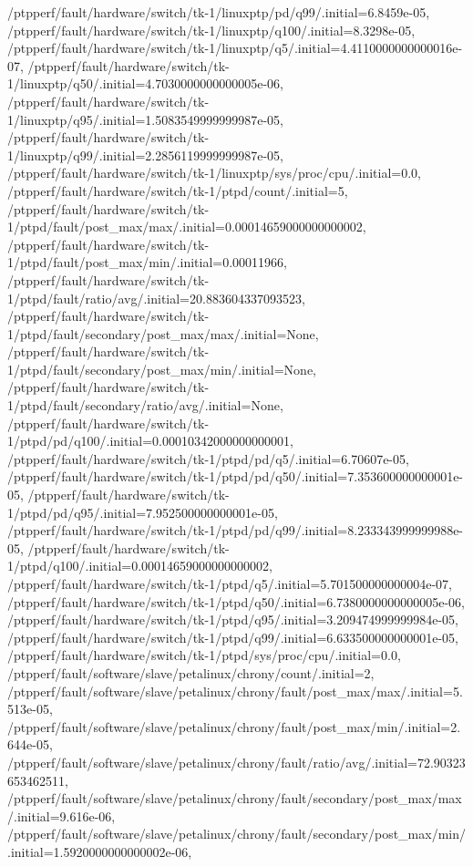 {    /ptpperf/fault/hardware/switch/tk-1/linuxptp/pd/q99/.initial=6.8459e-05,
    /ptpperf/fault/hardware/switch/tk-1/linuxptp/q100/.initial=8.3298e-05,
    /ptpperf/fault/hardware/switch/tk-1/linuxptp/q5/.initial=4.4110000000000016e-07,
    /ptpperf/fault/hardware/switch/tk-1/linuxptp/q50/.initial=4.7030000000000005e-06,
    /ptpperf/fault/hardware/switch/tk-1/linuxptp/q95/.initial=1.5083549999999987e-05,
    /ptpperf/fault/hardware/switch/tk-1/linuxptp/q99/.initial=2.2856119999999987e-05,
    /ptpperf/fault/hardware/switch/tk-1/linuxptp/sys/proc/cpu/.initial=0.0,
    /ptpperf/fault/hardware/switch/tk-1/ptpd/count/.initial=5,
    /ptpperf/fault/hardware/switch/tk-1/ptpd/fault/post_max/max/.initial=0.00014659000000000002,
    /ptpperf/fault/hardware/switch/tk-1/ptpd/fault/post_max/min/.initial=0.00011966,
    /ptpperf/fault/hardware/switch/tk-1/ptpd/fault/ratio/avg/.initial=20.883604337093523,
    /ptpperf/fault/hardware/switch/tk-1/ptpd/fault/secondary/post_max/max/.initial=None,
    /ptpperf/fault/hardware/switch/tk-1/ptpd/fault/secondary/post_max/min/.initial=None,
    /ptpperf/fault/hardware/switch/tk-1/ptpd/fault/secondary/ratio/avg/.initial=None,
    /ptpperf/fault/hardware/switch/tk-1/ptpd/pd/q100/.initial=0.00010342000000000001,
    /ptpperf/fault/hardware/switch/tk-1/ptpd/pd/q5/.initial=6.70607e-05,
    /ptpperf/fault/hardware/switch/tk-1/ptpd/pd/q50/.initial=7.353600000000001e-05,
    /ptpperf/fault/hardware/switch/tk-1/ptpd/pd/q95/.initial=7.952500000000001e-05,
    /ptpperf/fault/hardware/switch/tk-1/ptpd/pd/q99/.initial=8.233343999999988e-05,
    /ptpperf/fault/hardware/switch/tk-1/ptpd/q100/.initial=0.00014659000000000002,
    /ptpperf/fault/hardware/switch/tk-1/ptpd/q5/.initial=5.701500000000004e-07,
    /ptpperf/fault/hardware/switch/tk-1/ptpd/q50/.initial=6.7380000000000005e-06,
    /ptpperf/fault/hardware/switch/tk-1/ptpd/q95/.initial=3.209474999999984e-05,
    /ptpperf/fault/hardware/switch/tk-1/ptpd/q99/.initial=6.633500000000001e-05,
    /ptpperf/fault/hardware/switch/tk-1/ptpd/sys/proc/cpu/.initial=0.0,
    /ptpperf/fault/software/slave/petalinux/chrony/count/.initial=2,
    /ptpperf/fault/software/slave/petalinux/chrony/fault/post_max/max/.initial=5.513e-05,
    /ptpperf/fault/software/slave/petalinux/chrony/fault/post_max/min/.initial=2.644e-05,
    /ptpperf/fault/software/slave/petalinux/chrony/fault/ratio/avg/.initial=72.90323653462511,
    /ptpperf/fault/software/slave/petalinux/chrony/fault/secondary/post_max/max/.initial=9.616e-06,
    /ptpperf/fault/software/slave/petalinux/chrony/fault/secondary/post_max/min/.initial=1.5920000000000002e-06,
}
